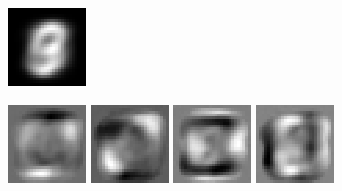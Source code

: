 \documentclass[twocolumn]{article}
\begin{document}
\begin{figure}
\begin{subfigure}{.3\linewidth}
    \caption{}  
  \end{subfigure}
  \begin{subfigure}{.3\linewidth}
    \includegraphics[width=\linewidth]{X_l_eigv_1.eps}
    \caption{}
  \end{subfigure}\par\medskip
  \begin{subfigure}{\linewidth}
    \includegraphics[width=.1\linewidth]{W_l_eigv_2.eps}
    \includegraphics[width=.1\linewidth]{W_l_eigv_3.eps}
    \includegraphics[width=.1\linewidth]{W_l_eigv_4.eps}
    \includegraphics[width=.1\linewidth]{W_l_eigv_5.eps}

\end{subfigure}
\end{figure}
\end{document}

